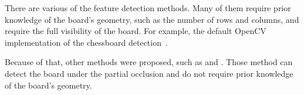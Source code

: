 There are various of the feature detection methods. Many of them require
prior knowledge of the board's geometry, such as the number of rows and columns,
and require the full visibility of the board. For example, the default OpenCV
implementation of the chessboard detection~\citep{OpenCVCameraCalibration}.

Because of that, other methods were proposed, such as
\cite{fuersattelOCPADOccludedCheckerboard2016} and
\cite{geigerAutomaticCameraRange2012}. Those method can detect the board under
the partial occlusion and do not require prior knowledge of the board's geometry.

